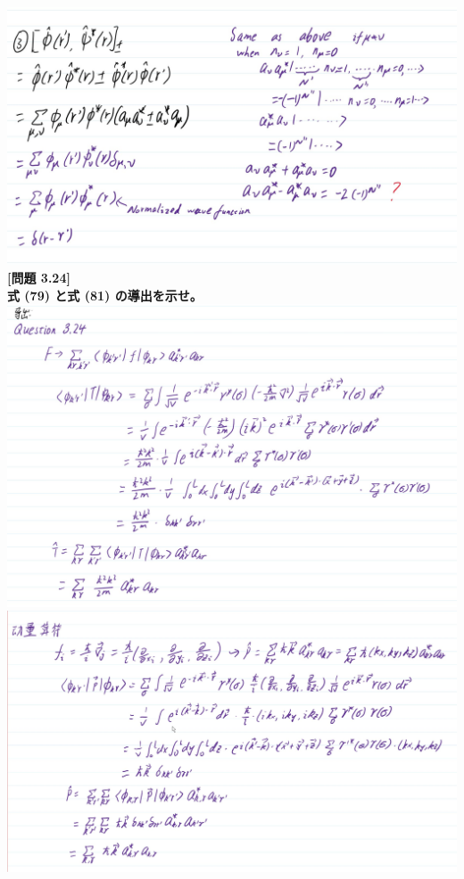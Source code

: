 \documentclass[11pt,largemargins]{homework}
\begin{document}
\includegraphics[scale=0.6]{Question/Q3.16-3.jpg}
\newpage
\question
\textbf{[問題 3.24]\\式 (79) と式 (81) の導出を示せ。}\\
\includegraphics[scale=0.7]{Question/Q3.24-1.jpg}\\
\includegraphics[scale=0.6]{Question/Q3.24-2.jpg}
\end{document}
